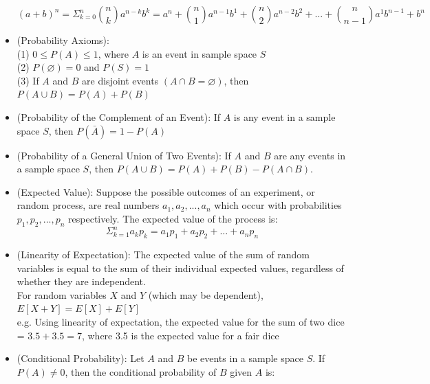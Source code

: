 \documentclass{article}
\begin{document}
\begin{itemize}
        \begin{equation*}
            (a+b)^n=\Sigma^n_{k=0}\binom{n}{k}a^{n-k}b^k = a^n+\binom{n}{1}a^{n-1}b^1+\binom{n}{2}a^{n-2}b^2+...+\binom{n}{n-1}a^1b^{n-1}+b^n
        \end{equation*}
    \item (Probability Axioms):
        \\ \hspace*{3mm} (1) $0\leqslant P(A)\leqslant1$, where $A$ is an event in sample space $S$
        \\ \hspace*{3mm} (2) $P(\varnothing)=0$ and $P(S)=1$
        \\ \hspace*{3mm} (3) If $A$ and $B$ are disjoint events $(A\cap B=\varnothing)$, then $P(A\cup B)=P(A)+P(B)$
    \item (Probability of the Complement of an Event): If $A$ is any event in a sample space $S$, then $P(\bar{A})=1-P(A)$
    \item (Probability of a General Union of Two Events): If $A$ and $B$ are any events in a sample space $S$, then $P(A\cup B)=P(A)+P(B)-P(A\cap B)$.
    \item (Expected Value): Suppose the possible outcomes of an experiment, or random process, are real numbers $a_1,a_2,...,a_n$ which occur with probabilities $p_1,p_2,...,p_n$ respectively. The expected value of the process is:
        \begin{equation*}
            \Sigma^n_{k=1}a_kp_k=a_1p_1+a_2p_2+...+a_np_n
        \end{equation*}
    \item (Linearity of Expectation): The expected value of the sum of random variables is equal to the sum of their individual expected values, regardless of whether they are independent.
        \smallskip
        \\ \hspace*{3mm} For random variables $X$ and $Y$ (which may be dependent), $E[X+Y]=E[X]+E[Y]$
        \smallskip
        \\ \hspace*{3mm} e.g. Using linearity of expectation, the expected value for the sum of two dice = $3.5+3.5=7$, where 3.5 is \hspace*{3mm} the expected value for a fair dice
    \item (Conditional Probability): Let $A$ and $B$ be events in a sample space $S$. If $P(A)\neq0$, then the conditional probability of $B$ given $A$ is:

\end{itemize}
\end{document}
